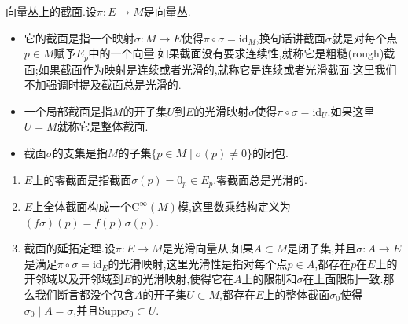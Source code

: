 向量丛上的截面.设$\pi:E\to M$是向量丛.
\begin{itemize}
	\item 它的截面是指一个映射$\sigma:M\to E$使得$\pi\circ\sigma=\mathrm{id}_M$,换句话讲截面$\sigma$就是对每个点$p\in M$赋予$E_p$中的一个向量.如果截面没有要求连续性,就称它是粗糙(rough)截面;如果截面作为映射是连续或者光滑的,就称它是连续或者光滑截面.这里我们不加强调时提及截面总是光滑的.
	\item 一个局部截面是指$M$的开子集$U$到$E$的光滑映射$\sigma$使得$\pi\circ\sigma=\mathrm{id}_U$.如果这里$U=M$就称它是整体截面.
	\item 截面$\sigma$的支集是指$M$的子集$\{p\in M\mid\sigma(p)\not=0\}$的闭包.
\end{itemize}
\begin{enumerate}
	\item $E$上的零截面是指截面$\sigma(p)=0_p\in E_p$.零截面总是光滑的.
	\item $E$上全体截面构成一个$\mathrm{C}^{\infty}(M)$模,这里数乘结构定义为$(f\sigma)(p)=f(p)\sigma(p)$.
	\item 截面的延拓定理.设$\pi:E\to M$是光滑向量从,如果$A\subset M$是闭子集,并且$\sigma:A\to E$是满足$\pi\circ\sigma=\mathrm{id}_E$的光滑映射,这里光滑性是指对每个点$p\in A$,都存在$p$在$E$上的开邻域以及开邻域到$E$的光滑映射,使得它在$A$上的限制和$\sigma$在上面限制一致.那么我们断言都没个包含$A$的开子集$U\subset M$,都存在$E$上的整体截面$\sigma_0$使得$\sigma_0\mid A=\sigma$,并且$\mathrm{Supp}\sigma_0\subset U$.
\end{enumerate}

